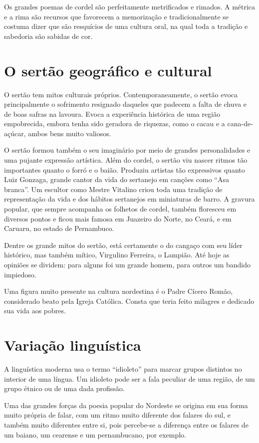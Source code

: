 Os grandes poemas de cordel são perfeitamente metrificados e rimados. A
métrica e a rima são recursos que favorecem a memorização e
tradicionalmente se costuma dizer que são resquícios de uma cultura
oral, na qual toda a tradição e sabedoria são sabidas de cor. 


\section{O sertão geográfico e cultural}

O sertão tem mitos culturais próprios. Contemporaneamente, o sertão
evoca principalmente o sofrimento resignado daqueles que padecem a
falta de chuva e de boas safras na lavoura. Evoca a experiência
histórica de uma região empobrecida, embora tenha sido geradora de
riquezas, como o cacau e a cana-de-açúcar, ambos bens muito valiosos. 

O sertão formou também o seu imaginário por meio de grandes
personalidades e uma pujante expressão artística. Além do cordel, o
sertão viu nascer ritmos tão importantes quanto o forró e o baião.
Produziu artistas tão expressivos quanto Luiz Gonzaga, grande cantor da
vida do sertanejo em canções como ``Asa
branca''. Um escultor como Mestre Vitalino criou toda
uma tradição de representação da vida e dos hábitos sertanejos em
miniaturas de barro. A gravura popular, que sempre acompanha os
folhetos de cordel, também floresceu em diversos pontos e ficou mais
famosa em Juazeiro do Norte, no Ceará, e em Caruaru, no estado de
Pernambuco. 

Dentre os grande mitos do sertão, está certamente o do cangaço com seu
líder histórico, mas também mítico, Virgulino Ferreira, o Lampião. Até
hoje as opiniões se dividem: para alguns foi um grande homem, para
outros um bandido impiedoso. 

Uma figura muito presente na cultura nordestina é o Padre Cícero Romão,
considerado beato pela Igreja Católica. Consta que teria feito milagres
e dedicado sua vida aos pobres. 

\section{Variação linguística}

A linguística moderna usa o termo ``idioleto'' para marcar grupos
distintos no interior de uma língua. Um idioleto pode ser a fala
peculiar de uma região, de um grupo étnico ou de uma dada profissão. 

Uma das grandes forças da poesia popular do Nordeste se origina em sua
forma muito própria de falar, com um ritmo muito diferente dos falares
do sul, e também muito diferentes entre si, pois percebe-se a diferença
entre os falares de um baiano, um cearense e um pernambucano, por
exemplo.

